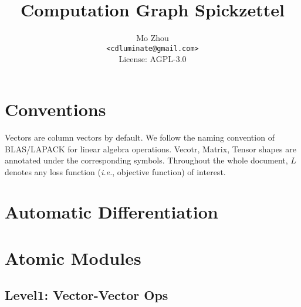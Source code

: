 \documentclass[9pt,twocolumn,times]{article}
\title{Computation Graph Spickzettel}
\author{Mo Zhou\\\small\texttt{<cdluminate@gmail.com>}\\
License: AGPL-3.0}
\begin{document}
\maketitle
\tableofcontents
\newpage

\section{Conventions}

Vectors are column vectors by default.
We follow the naming convention of BLAS/LAPACK for linear algebra operations.
Vecotr, Matrix, Tensor shapes are annotated under the corresponding symbols.
Throughout the whole document, $L$ denotes any loss function (\emph{i.e.},
objective function) of interest.

\section{Automatic Differentiation}

\section{Atomic Modules}

\subsection{Level1: Vector-Vector Ops}
\end{document}
